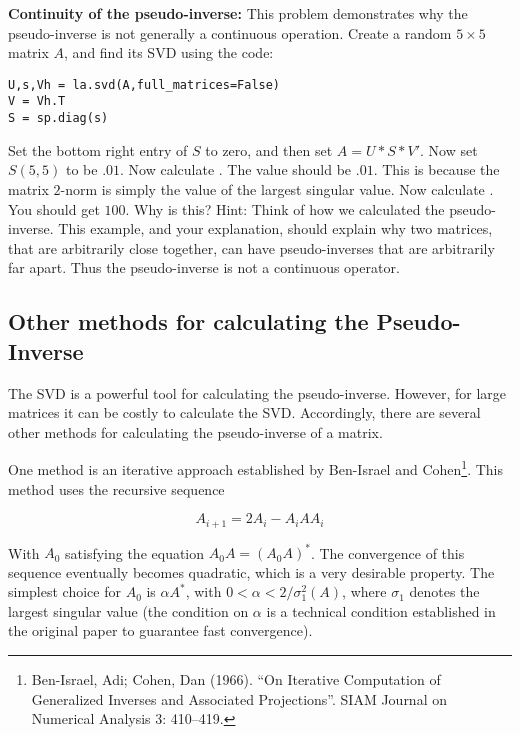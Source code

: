 \begin{problem}
{\bf Continuity of the pseudo-inverse:} This problem demonstrates why the pseudo-inverse is not generally a continuous operation. Create a random $5 \times 5$ matrix $A$, and find its SVD using the code:
\begin{lstlisting}
U,s,Vh = la.svd(A,full_matrices=False)
V = Vh.T
S = sp.diag(s)
\end{lstlisting}
Set the bottom right entry of $S$ to zero, and then set $A = U*S*V'$. Now set $S(5,5)$ to be $.01$. Now calculate . The value should be $.01$. This is because the matrix $2$-norm is simply the value of the largest singular value. Now calculate . You should get $100$. Why is this? Hint: Think of how we calculated the pseudo-inverse. This example, and your explanation, should explain why two matrices, that are arbitrarily close together, can have pseudo-inverses that are arbitrarily far apart. Thus the pseudo-inverse is not a continuous operator.
\end{problem}

\subsection*{Other methods for calculating the Pseudo-Inverse}

The SVD is a powerful tool for calculating the pseudo-inverse. However, for large matrices it can be costly to calculate the SVD. Accordingly, there are several other methods for calculating the pseudo-inverse of a matrix.

One method is an iterative approach established by Ben-Israel and Cohen\footnote{Ben-Israel, Adi; Cohen, Dan (1966). ``On Iterative Computation of Generalized Inverses and Associated Projections''. SIAM Journal on Numerical Analysis 3: 410–419.}. This method uses the recursive sequence

\[
A_{i+1} = 2A_i - A_i A A_i
\]

With $A_0$ satisfying the equation $A_0 A = (A_0 A)^*$. The convergence of this sequence eventually becomes quadratic, which is a very desirable property. The simplest choice for $A_0$ is $\alpha A^*$, with $0 < \alpha < 2/\sigma_1^2(A)$, where $\sigma_1$ denotes the largest singular value (the condition on $\alpha$ is a technical condition established in the original paper to guarantee fast convergence).

